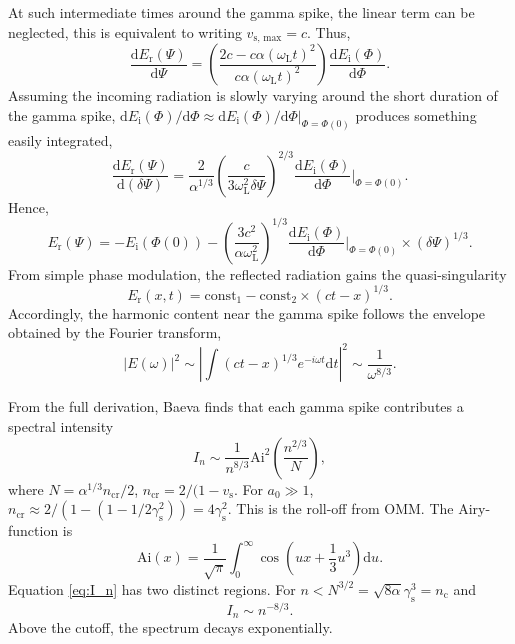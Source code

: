 At such intermediate times around the gamma spike, the linear term can be neglected, this is equivalent to writing $v_\mathrm{s,\, max} = c$. Thus,
\begin{equation}
	\frac{\mathrm{d}E_\mathrm{r}(\Psi)}{\mathrm{d}\Psi} = \left(\frac{2c - c\alpha (\omega_\mathrm{L}t)^2}{c\alpha (\omega_\mathrm{L}t)^2}\right)\frac{\mathrm{d}E_\mathrm{i}(\Phi)}{\mathrm{d}\Phi}.
\end{equation}
Assuming the incoming radiation is slowly varying around the short duration of the gamma spike, $\mathrm{d}E_\mathrm{i}(\Phi)/\mathrm{d}\Phi \approx \mathrm{d}E_\mathrm{i}(\Phi)/\mathrm{d}\Phi|_{\Phi = \Phi(0)}$ produces something easily integrated,
\begin{equation}
	\frac{\mathrm{d}E_\mathrm{r}(\Psi)}{\mathrm{d}(\delta \Psi)} = \frac{2}{\alpha^{1/3}} \left(\frac{c}{3\omega_\mathrm{L}^2 \delta \Psi}\right)^{2/3}\frac{\mathrm{d}E_\mathrm{i}(\Phi)}{\mathrm{d}\Phi}|_{\Phi = \Phi(0)}.
\end{equation}
Hence,
\begin{equation}
	E_\mathrm{r}(\Psi) = -E_\mathrm{i}(\Phi(0)) - \left(\frac{3c^2}{\alpha \omega_\mathrm{L}^2}\right)^{1/3}\frac{\mathrm{d}E_\mathrm{i}(\Phi)}{\mathrm{d}\Phi}|_{\Phi = \Phi(0)} \times (\delta \Psi)^{1/3}.
\end{equation}
From simple phase modulation, the reflected radiation gains the quasi-singularity
\begin{equation}
	E_\mathrm{r}(x,t) = \mathrm{const}_1 - \mathrm{const_2}\times (ct - x)^{1/3}.
\end{equation}
Accordingly, the harmonic content near the gamma spike follows the envelope obtained by the Fourier transform,
\begin{equation}
	|E(\omega)|^2 \sim \left|\int (ct-x)^{1/3}e^{-i\omega t} \mathrm{d} t\right|^2 \sim \frac{1}{\omega^{8/3}}.
\end{equation}

From the full derivation, Baeva finds that each gamma spike contributes a spectral intensity
\begin{equation}\label{eq:I_n}
	I_n \sim \frac{1}{n^{8/3}} \mathrm{Ai}^2\left(\frac{n^{2/3}}{N}\right),
\end{equation}
where $N = \alpha^{1/3}n_\mathrm{cr}/2$, $n_\mathrm{cr} = 2/(1-v_\mathrm{s}$. For $a_0 \gg 1$, $n_\mathrm{cr} \approx 2/(1-(1-1/2\gamma_\mathrm{s}^2)) = 4 \gamma_\mathrm{s}^2$. This is the roll-off from \ac{OMM}. The Airy-function is
\begin{equation}
	\mathrm{Ai}(x) = \frac{1}{\sqrt{\pi}}\int_0^\infty \cos\left(ux + \frac{1}{3} u^3\right) \mathrm{d}u.
\end{equation}
Equation \ref{eq:I_n} has two distinct regions. For $n<N^{3/2} = \sqrt{8\alpha}\gamma_\mathrm{s}^3 = n_\mathrm{c}$ and
\begin{equation}
	I_n \sim n^{-8/3}.
\end{equation}
Above the cutoff, the spectrum decays exponentially.

